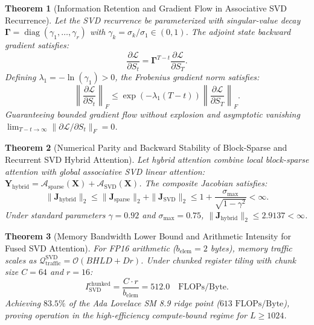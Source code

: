 \documentclass[journal]{IEEEtran}
\newtheorem{theorem}{Theorem}
\begin{document}
\begin{theorem}[Information Retention and Gradient Flow in Associative SVD Recurrence]
Let the SVD recurrence be parameterized with singular-value decay $\boldsymbol{\Gamma} = \operatorname{diag}(\gamma_1, \dots, \gamma_r)$ with $\gamma_k = \sigma_k / \sigma_1 \in (0, 1)$. The adjoint state backward gradient satisfies:
\begin{equation}
\frac{\partial \mathcal{L}}{\partial S_t} = \boldsymbol{\Gamma}^{T - t} \frac{\partial \mathcal{L}}{\partial S_T}.
\end{equation}
Defining $\lambda_1 = -\ln(\gamma_1) > 0$, the Frobenius gradient norm satisfies:
\begin{equation}
\left\| \frac{\partial \mathcal{L}}{\partial S_t} \right\|_F \le \exp\left( -\lambda_1 (T - t) \right) \left\| \frac{\partial \mathcal{L}}{\partial S_T} \right\|_F.
\end{equation}
Guaranteeing bounded gradient flow without explosion and asymptotic vanishing $\lim_{T-t \to \infty} \|\partial \mathcal{L} / \partial S_t\|_F = 0$.
\end{theorem}

\begin{theorem}[Numerical Parity and Backward Stability of Block-Sparse and Recurrent SVD Hybrid Attention]
Let hybrid attention combine local block-sparse attention with global associative SVD linear attention: $\mathbf{Y}_{\text{hybrid}} = \mathcal{A}_{\text{sparse}}(\mathbf{X}) + \mathcal{A}_{\text{SVD}}(\mathbf{X})$. The composite Jacobian satisfies:
\begin{equation}
\|\mathbf{J}_{\text{hybrid}}\|_2 \le \|\mathbf{J}_{\text{sparse}}\|_2 + \|\mathbf{J}_{\text{SVD}}\|_2 \le 1 + \frac{\sigma_{\max}}{\sqrt{1 - \gamma^2}} < \infty.
\end{equation}
Under standard parameters $\gamma=0.92$ and $\sigma_{\max}=0.75$, $\|\mathbf{J}_{\text{hybrid}}\|_2 \le 2.9137 < \infty$.
\end{theorem}

\begin{theorem}[Memory Bandwidth Lower Bound and Arithmetic Intensity for Fused SVD Attention]
For FP16 arithmetic ($b_{\text{elem}}=2$ bytes), memory traffic scales as $\mathcal{Q}_{\text{traffic}}^{\text{SVD}} = \mathcal{O}(B H L D + D r)$. Under chunked register tiling with chunk size $C=64$ and $r=16$:
\begin{equation}
I_{\text{SVD}}^{\text{chunked}} = \frac{C \cdot r}{b_{\text{elem}}} = 512.0 \quad \text{FLOPs/Byte}.
\end{equation}
Achieving $83.5\%$ of the Ada Lovelace SM 8.9 ridge point ($613 \text{ FLOPs/Byte}$), proving operation in the high-efficiency compute-bound regime for $L \ge 1024$.
\end{theorem}
\end{document}

